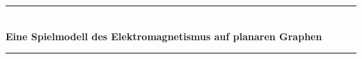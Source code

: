 \documentclass[11pt,a4paper,leqno]{report}
\numberwithin{equation}{chapter}
\renewcommand{\contentsname}{Inhaltsverzeichnis}
\begin{document}
\begin{titlepage}

\vspace*{5cm}
\begin{center}
\rule{\linewidth}{0.5mm} \\[0.4cm]
{ \Huge \bfseries Eine Spielmodell des Elektromagnetismus auf planaren Graphen} \\[0.2cm]
\rule{\linewidth}{0.5mm} \\[3.5cm]
\begin{minipage}[t]{0.4\textwidth}
%

\end{minipage}
\begin{minipage}[t]{0.4\textwidth}

\end{minipage}
 

 
\end{center}
 
\end{titlepage}




\tableofcontents


\vfill
\end{document}
